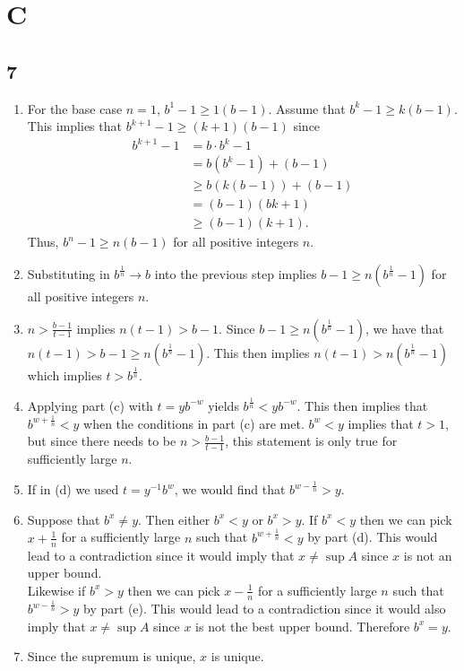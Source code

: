 \documentclass{article}
\begin{document}
\section*{C}
\subsection*{7}
\begin{enumerate}
    \item For the base case $n=1$, $b^1 -1 \geq 1(b-1)$.
    Assume that $b^k - 1\geq k(b-1)$. 
    This implies that $b^{k+1} - 1\geq (k+1)(b-1)$ since
    \begin{align*}
        b^{k+1} -1 &= b\cdot b^k - 1\\
        &= b(b^k-1) + (b-1) \\
        &\geq b(k(b-1)) + (b-1) \\ 
        &= (b-1)(bk+1) \\
        &\geq (b-1)(k+1).
    \end{align*}
    Thus, $b^n - 1\geq n(b-1)$ for all positive integers $n$.
    \item Substituting in $b^{\frac{1}{n}} \rightarrow b$ into the previous step 
    implies $b - 1\geq n(b^{\frac{1}{n}}-1)$ for all positive integers $n$.
    \item $n > \frac{b-1}{t-1}$ implies $n(t-1) > b-1$. 
    Since $b - 1\geq n(b^{\frac{1}{n}}-1)$, we have that  
    $n(t-1)> b - 1 \geq n(b^{\frac{1}{n}}-1)$.
    This then implies $n(t-1)> n(b^{\frac{1}{n}}-1)$ which 
    implies $t > b^{\frac{1}{n}}$.
    \item Applying part (c) with $t = yb^{-w}$ yields $b^{\frac{1}{n}} < yb^{-w}$.
    This then implies that $b^{w+\frac{1}{n}} < y$ when the conditions in part (c) are met.
    $b^w < y$ implies that $t > 1$, but since there needs to be 
    $n > \frac{b-1}{t-1}$, this statement is only true for sufficiently large $n$.
    \item If in (d) we used $t = y^{-1}b^w$, we would find that $b^{w-\frac{1}{n}} > y$.
    \item Suppose that $b^x \neq y$. Then either $b^x < y$ or $b^x > y$.
    If $b^x < y$ then we can pick $x+\frac{1}{n}$ for a sufficiently large $n$ such that 
    $b^{w+\frac{1}{n}} < y$ by part (d). This would lead to a contradiction since it would imply 
    that $x \neq \sup A$ since $x$ is not an upper bound. \\

    Likewise if $b^x > y$ then we can pick $x-\frac{1}{n}$ for a sufficiently large $n$ such that 
    $b^{w-\frac{1}{n}} > y$ by part (e). This would lead to a contradiction since it would also imply 
    that $x \neq \sup A$ since $x$ is not the best upper bound. 
    Therefore $b^x = y$.\\

    \item Since the supremum is unique, $x$ is unique.
\end{enumerate}
\end{document}
